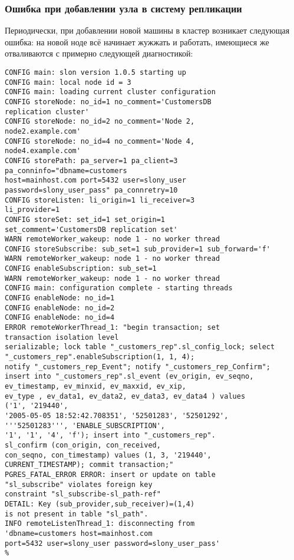 \subsubsection{Ошибка при добавлении узла в систему репликации}
Периодически, при добавлении новой машины в кластер возникает следующая ошибка: на новой ноде всё начинает
жужжать и работать, имеющиеся же отваливаются с примерно следующей диагностикой:
\begin{lstlisting}[label=lst:slony17,caption=Устранение неисправностей]
%slon customers_rep "dbname=customers user=slony_user"
CONFIG main: slon version 1.0.5 starting up
CONFIG main: local node id = 3
CONFIG main: loading current cluster configuration
CONFIG storeNode: no_id=1 no_comment='CustomersDB
replication cluster'
CONFIG storeNode: no_id=2 no_comment='Node 2,
node2.example.com'
CONFIG storeNode: no_id=4 no_comment='Node 4,
node4.example.com'
CONFIG storePath: pa_server=1 pa_client=3
pa_conninfo="dbname=customers
host=mainhost.com port=5432 user=slony_user
password=slony_user_pass" pa_connretry=10
CONFIG storeListen: li_origin=1 li_receiver=3
li_provider=1
CONFIG storeSet: set_id=1 set_origin=1
set_comment='CustomersDB replication set'
WARN remoteWorker_wakeup: node 1 - no worker thread
CONFIG storeSubscribe: sub_set=1 sub_provider=1 sub_forward='f'
WARN remoteWorker_wakeup: node 1 - no worker thread
CONFIG enableSubscription: sub_set=1
WARN remoteWorker_wakeup: node 1 - no worker thread
CONFIG main: configuration complete - starting threads
CONFIG enableNode: no_id=1
CONFIG enableNode: no_id=2
CONFIG enableNode: no_id=4
ERROR remoteWorkerThread_1: "begin transaction; set
transaction isolation level
serializable; lock table "_customers_rep".sl_config_lock; select
"_customers_rep".enableSubscription(1, 1, 4);
notify "_customers_rep_Event"; notify "_customers_rep_Confirm";
insert into "_customers_rep".sl_event (ev_origin, ev_seqno,
ev_timestamp, ev_minxid, ev_maxxid, ev_xip,
ev_type , ev_data1, ev_data2, ev_data3, ev_data4 ) values
('1', '219440',
'2005-05-05 18:52:42.708351', '52501283', '52501292',
'''52501283''', 'ENABLE_SUBSCRIPTION',
'1', '1', '4', 'f'); insert into "_customers_rep".
sl_confirm (con_origin, con_received,
con_seqno, con_timestamp) values (1, 3, '219440',
CURRENT_TIMESTAMP); commit transaction;"
PGRES_FATAL_ERROR ERROR: insert or update on table
"sl_subscribe" violates foreign key
constraint "sl_subscribe-sl_path-ref"
DETAIL: Key (sub_provider,sub_receiver)=(1,4)
is not present in table "sl_path".
INFO remoteListenThread_1: disconnecting from
'dbname=customers host=mainhost.com
port=5432 user=slony_user password=slony_user_pass'
%
\end{lstlisting}



